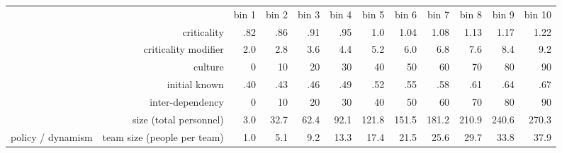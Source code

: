 
\begin{tabular}{@{ } l @{ } r | @{ } r | @{ } r | @{ } r | @{ } r | @{ } r | @{ } r | @{ } r | @{ } r | @{ } r | @{ } r |}
\cline{3-12}
  	&& bin 1 & bin 2 & bin 3 & bin 4 & bin 5 & bin 6 & bin 7 & bin 8 & bin 9 & bin 10 \\
          \cline{2-12}
	  & criticality
	  & .82
	  & .86
	  & .91
	  & .95
	  & 1.0
	  & 1.04
	  & 1.08
	  & 1.13
	  & 1.17
	  & 1.22\\
	  & criticality modifier
  	  & 2.0
	  & 2.8
	  & 3.6
	  & 4.4
	  & 5.2
	  & 6.0
	  & 6.8
	  & 7.6
	  & 8.4
	  & 9.2\\
	  &culture
	  & 0
	  & 10
	  & 20
	  & 30
	  & 40
	  & 50
	  & 60
	  & 70
	  & 80
	  & 90 \\
	  &initial known
	  & .40
	  & .43
	  & .46
	  & .49
	  & .52
	  & .55
	  & .58
	  & .61
	  & .64
	  & .67\\
	  &inter-dependency
	  & 0
	  & 10
	  & 20
	  & 30
	  & 40
	  & 50
	  & 60
	  & 70
	  & 80
	  & 90\\
	  &size (total personnel)
	  & 3.0
	  & 32.7
	  & 62.4
	  & 92.1
	  & 121.8
	  & 151.5
	  & 181.2
	  & 210.9
	  & 240.6
	  & 270.3\\
policy / dynamism&team size (people per team)
	  & 1.0
	  & 5.1
	  & 9.2
	  & 13.3
	  & 17.4
	  & 21.5
	  & 25.6
	  & 29.7
	  & 33.8
	  & 37.9\\
          


\end{tabular}
